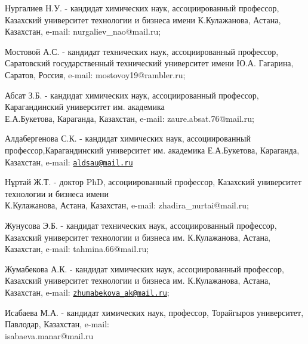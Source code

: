 \begin{authorinfo}
Нургалиев Н.У. - кандидат химических наук, ассоциированный профессор,
Казахский университет технологии и бизнеса имени К.Кулажанова, Астана,
Казахстан, e-mail: nurgaliev\_nao@mail.ru;

Мостовой А.С. - кандидат технических наук, ассоциированный профессор,
Саратовский государственный технический университет имени Ю.А. Гагарина,
Саратов, Россия, e-mail: mostovoy19@rambler.ru;

Абсат З.Б. - кандидат химических наук, ассоциированный профессор,
Карагандинский университет им. академика \\Е.А.Букетова, Караганда,
Казахстан, e-mail: zaure.absat.76@mail.ru;

Алдабергенова С.К. - кандидат химических наук, ассоциированный
профессор,Карагандинский университет им. академика Е.А.Букетова,
Караганда, Казахстан, e-mail:
\href{mailto:aldsau@mail.ru}{\nolinkurl{aldsau@mail.ru}}

Нұртай Ж.Т. - доктор PhD, ассоциированный профессор, Казахский
университет технологии и бизнеса имени \\К.Кулажанова, Астана, Казахстан,
e-mail: zhadira\_nurtai@mail.ru;

Жунусова Э.Б. - кандидат технических наук, ассоциированный профессор,
Казахский университет технологии и бизнеса им. К.Кулажанова, Астана,
Казахстан, e-mail: tahmina.66@mail.ru;

Жумабекова А.К. - кандидат химических наук, ассоциированный профессор,
Казахский университет технологии и бизнеса им. К.Кулажанова, Астана,
Казахстан, e-mail:
\href{mailto:zhumabekova_ak@mail.ru}{\nolinkurl{zhumabekova\_ak@mail.ru}};

Исабаева М.А. - кандидат химических наук, профессор, Торайгыров
университет, Павлодар, Казахстан, e-mail: \\isabaeva.manar@mail.ru
\end{authorinfo}
